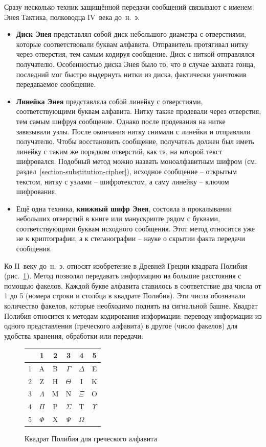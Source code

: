 Сразу несколько техник защищённой передачи сообщений связывают с именем Энея Тактика, полководца IV~века до~н.~э.
\begin{itemize}
	\item \textbf{Диск Энея} представлял собой диск небольшого диаметра с отверстиями, которые соответствовали буквам алфавита. Отправитель протягивал нитку через отверстия, тем самым кодируя сообщение. Диск с ниткой отправлялся получателю. Особенностью диска Энея было то, что в случае захвата гонца, последний мог быстро выдернуть нитки из диска, фактически уничтожив передаваемое сообщение.
	\item \textbf{Линейка Энея} представляла собой линейку с отверстиями, соответствующими буквам алфавита. Нитку также продевали через отверстия, тем самым шифруя сообщение. Однако после продевания на нитке завязывали узлы. После окончания нитку снимали с линейки и отправляли получателю. Чтобы восстановить сообщение, получатель должен был иметь линейку с таким же порядком отверстий, как та, на которой текст шифровался. Подобный метод можно назвать моноалфавитным шифром (см. раздел~\ref{section-substitution-cipher}), исходное сообщение -- открытым текстом, нитку с узлами -- шифротекстом, а саму линейку -- ключом шифрования.
	\item Ещё одна техника, \textbf{книжный шифр Энея}, состояла в прокалывании небольших отверстий в книге или манускрипте рядом с буквами, соответствующими буквам исходного сообщения. Этот метод относится уже не к криптографии, а к стеганографии -- науке о скрытии факта передачи сообщения.
\end{itemize}

Ко II~веку до~н.~э. относят изобретение в Древней Греции квадрата Полибия (рис.~\ref{fig:polubios-square}). Метод позволял передавать информацию на большие расстояния с помощью факелов. Каждой букве алфавита ставилось в соответствие два числа от 1 до 5 (номера строки и столбца в квадрате Полибия). Эти числа обозначали количество факелов, которые необходимо поднять на сигнальной башне. Квадрат Полибия относится к методам кодирования информации: переводу информации из одного представления (греческого алфавита) в другое (число факелов) для удобства хранения, обработки или передачи.

\begin{figure}[t]
	\centering
\begin{tabular}{ || c || c | c | c | c | c ||}
\hline
\hline
  & 1 & 2 & 3 & 4 & 5 \\
\hline
\hline
1 & A & B & $\Gamma$ & $\Delta$ & E \\
\hline
2 & Z & H & $\Theta$ & I & K \\
\hline
3 & $\Lambda$ & M & N & $\Xi$ & O  \\
\hline
4 & $\Pi$ & P & $\Sigma$ & T & $\Upsilon$ \\
\hline
5 & $\Phi$ & X & $\Psi$ & $\Omega$ & \\
\hline
\hline
\end{tabular}
  \caption{Квадрат Полибия для греческого алфавита}
  \label{fig:polubios-square}
\end{figure}

